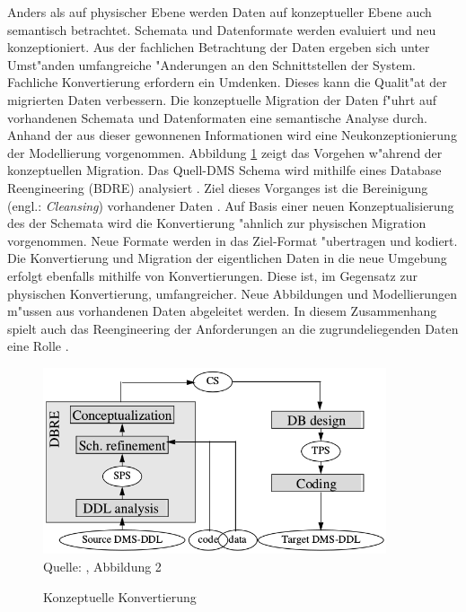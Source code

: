 Anders als auf physischer Ebene werden Daten auf konzeptueller Ebene auch semantisch betrachtet. Schemata und Datenformate werden evaluiert und neu konzeptioniert. Aus der fachlichen Betrachtung der Daten ergeben sich unter Umst"anden umfangreiche "Anderungen an den Schnittstellen der System. Fachliche Konvertierung erfordern ein Umdenken. Dieses kann die Qualit"at der migrierten Daten verbessern.
\lb
Die konzeptuelle Migration der Daten f"uhrt auf vorhandenen Schemata und Datenformaten eine semantische Analyse durch. Anhand der aus dieser gewonnenen Informationen wird eine Neukonzeptionierung der Modellierung vorgenommen. Abbildung \ref{pic:conversion_conceptual} zeigt das Vorgehen w"ahrend der konzeptuellen Migration. Das Quell-DMS Schema wird mithilfe eines Database Reengineering (BDRE) analysiert \citep{henrard-2002}. Ziel dieses Vorganges ist die Bereinigung (engl.: \textit{Cleansing}) vorhandener Daten \citep{rahm-2010} \citep{hernandez-1998}. Auf Basis einer neuen Konzeptualisierung des der Schemata wird die Konvertierung "ahnlich zur physischen Migration vorgenommen. Neue Formate werden in das Ziel-Format "ubertragen und kodiert. Die Konvertierung und Migration der eigentlichen Daten in die neue Umgebung erfolgt ebenfalls mithilfe von Konvertierungen. Diese ist, im Gegensatz zur physischen Konvertierung, umfangreicher. Neue Abbildungen und Modellierungen m"ussen aus vorhandenen Daten abgeleitet werden. In diesem Zusammenhang spielt auch das Reengineering der Anforderungen an die zugrundeliegenden Daten eine Rolle \citep{aiken-1994}.

\begin{figure}[h!]
	\centering
	\caption{Konzeptuelle Konvertierung}
	\label{pic:conversion_conceptual}
	\includegraphics[width=0.9\textwidth]{../images/strategies_fig_02b.png} \\
	\tiny Quelle: \citep{henrard-2002}, Abbildung 2
\end{figure}

